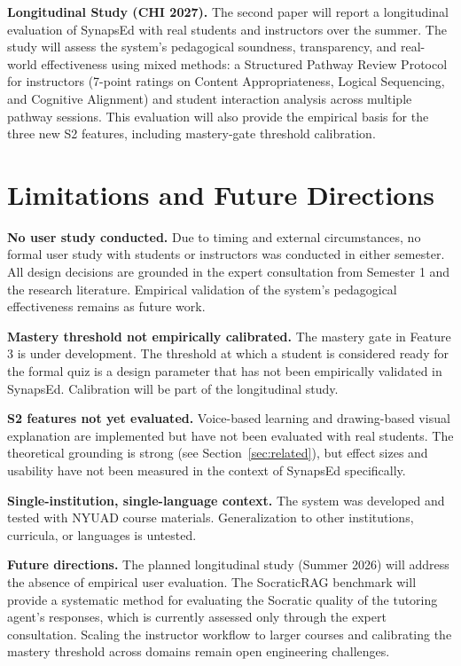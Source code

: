 \documentclass{stylefiles/capstone}
\begin{document}
\textbf{Longitudinal Study (CHI 2027).} The second paper will report a longitudinal evaluation of SynapsEd with real students and instructors over the summer. The study will assess the system's pedagogical soundness, transparency, and real-world effectiveness using mixed methods: a Structured Pathway Review Protocol for instructors (7-point ratings on Content Appropriateness, Logical Sequencing, and Cognitive Alignment) and student interaction analysis across multiple pathway sessions. This evaluation will also provide the empirical basis for the three new S2 features, including mastery-gate threshold calibration.

\section{Limitations and Future Directions}

\textbf{No user study conducted.} Due to timing and external circumstances, no formal user study with students or instructors was conducted in either semester. All design decisions are grounded in the expert consultation from Semester 1 and the research literature. Empirical validation of the system's pedagogical effectiveness remains as future work.

\textbf{Mastery threshold not empirically calibrated.} The mastery gate in Feature 3 is under development. The threshold at which a student is considered ready for the formal quiz is a design parameter that has not been empirically validated in SynapsEd. Calibration will be part of the longitudinal study.

\textbf{S2 features not yet evaluated.} Voice-based learning and drawing-based visual explanation are implemented but have not been evaluated with real students. The theoretical grounding is strong (see Section~\ref{sec:related}), but effect sizes and usability have not been measured in the context of SynapsEd specifically.

\textbf{Single-institution, single-language context.} The system was developed and tested with NYUAD course materials. Generalization to other institutions, curricula, or languages is untested.

\textbf{Future directions.} The planned longitudinal study (Summer 2026) will address the absence of empirical user evaluation. The SocraticRAG benchmark will provide a systematic method for evaluating the Socratic quality of the tutoring agent's responses, which is currently assessed only through the expert consultation. Scaling the instructor workflow to larger courses and calibrating the mastery threshold across domains remain open engineering challenges.
\end{document}
